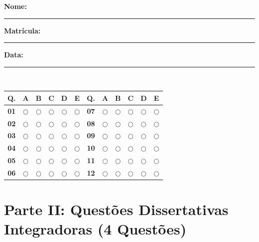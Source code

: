 \begin{tcolorbox}[colback=bgSoft, colframe=etIndigo, arc=3pt, boxrule=0.8pt, title={\bfseries Folha de Respostas Imprimível, Avaliação Geral Integrada (Parte I)}, coltitle=white, colbacktitle=etIndigo]
\textbf{Nome:} \rule{7.2cm}{0.4pt} \hfill \textbf{Matrícula:} \rule{3.0cm}{0.4pt} \hfill \textbf{Data:} \rule{2.2cm}{0.4pt}\\[6pt]
\renewcommand{\arraystretch}{1.25}
\centering
\footnotesize
\begin{tabularx}{\textwidth}{@{}c c c c c c | c c c c c c@{}}
  \toprule
  \rowcolor{bgGray}
  \textbf{Q.} & \textbf{A} & \textbf{B} & \textbf{C} & \textbf{D} & \textbf{E} & \textbf{Q.} & \textbf{A} & \textbf{B} & \textbf{C} & \textbf{D} & \textbf{E} \\
  \midrule
  \textbf{01} & $\bigcirc$ & $\bigcirc$ & $\bigcirc$ & $\bigcirc$ & $\bigcirc$ & \textbf{07} & $\bigcirc$ & $\bigcirc$ & $\bigcirc$ & $\bigcirc$ & $\bigcirc$ \\
  \textbf{02} & $\bigcirc$ & $\bigcirc$ & $\bigcirc$ & $\bigcirc$ & $\bigcirc$ & \textbf{08} & $\bigcirc$ & $\bigcirc$ & $\bigcirc$ & $\bigcirc$ & $\bigcirc$ \\
  \textbf{03} & $\bigcirc$ & $\bigcirc$ & $\bigcirc$ & $\bigcirc$ & $\bigcirc$ & \textbf{09} & $\bigcirc$ & $\bigcirc$ & $\bigcirc$ & $\bigcirc$ & $\bigcirc$ \\
  \textbf{04} & $\bigcirc$ & $\bigcirc$ & $\bigcirc$ & $\bigcirc$ & $\bigcirc$ & \textbf{10} & $\bigcirc$ & $\bigcirc$ & $\bigcirc$ & $\bigcirc$ & $\bigcirc$ \\
  \textbf{05} & $\bigcirc$ & $\bigcirc$ & $\bigcirc$ & $\bigcirc$ & $\bigcirc$ & \textbf{11} & $\bigcirc$ & $\bigcirc$ & $\bigcirc$ & $\bigcirc$ & $\bigcirc$ \\
  \textbf{06} & $\bigcirc$ & $\bigcirc$ & $\bigcirc$ & $\bigcirc$ & $\bigcirc$ & \textbf{12} & $\bigcirc$ & $\bigcirc$ & $\bigcirc$ & $\bigcirc$ & $\bigcirc$ \\
  \bottomrule
\end{tabularx}
\end{tcolorbox}

\section*{Parte II: Questões Dissertativas Integradoras (4 Questões)}

